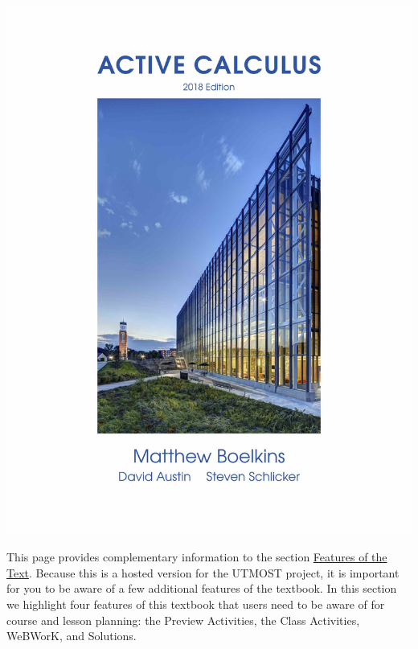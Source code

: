 \documentclass[10pt,]{article}
\begin{document}
\begin{sidebyside}{2}{0.0125}{0.0125}{0.025}
\begin{sbspanel}{0.25}
\includegraphics[width=1\linewidth]{images/cover-ac.jpg}
\end{sbspanel}
\begin{sbspanel}{0.7}
\hypertarget{p-21}{}%
This page provides complementary information to the section \href{https://books.aimath.org/ac/preface-3.html}{Features of the Text}. Because this is a hosted version for the UTMOST project, it is important for you to be aware of a few additional features of the textbook. In this section we highlight four features of this textbook that users need to be aware of for course and lesson planning: the Preview Activities, the Class Activities, WeBWorK, and Solutions.%
\end{sbspanel}
\end{sidebyside}
\typeout{************************************************}
\typeout{************************************************}
\end{document}
